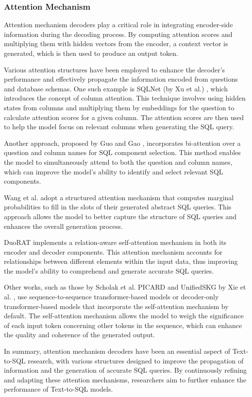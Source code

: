 \subsubsection{Attention Mechanism}

Attention mechanism decoders play a critical role in integrating encoder-side information during the decoding process. By computing attention scores and multiplying them with hidden vectors from the encoder, a context vector is generated, which is then used to produce an output token.

Various attention structures have been employed to enhance the decoder's performance and effectively propagate the information encoded from questions and database schemas. One such example is SQLNet (by Xu et al.) \cite{xu_sqlnet_2017}, which introduces the concept of column attention. This technique involves using hidden states from columns and multiplying them by embeddings for the question to calculate attention scores for a given column. The attention scores are then used to help the model focus on relevant columns when generating the SQL query.

Another approach, proposed by Guo and Gao  \cite{guo2020content}, incorporates bi-attention over a question and column names for SQL component selection. This method enables the model to simultaneously attend to both the question and column names, which can improve the model's ability to identify and select relevant SQL components.

Wang et al.  \cite{wang-etal-2019-learning} adopt a structured attention mechanism \cite{kim2017structured} that computes marginal probabilities to fill in the slots of their generated abstract SQL queries. This approach allows the model to better capture the structure of SQL queries and enhances the overall generation process.

DuoRAT \cite{scholak-etal-2021-duorat} implements a relation-aware self-attention mechanism in both its encoder and decoder components. This attention mechanism accounts for relationships between different elements within the input data, thus improving the model's ability to comprehend and generate accurate SQL queries.

Other works, such as those by Scholak et al. PICARD  \cite{Scholak2021:PICARD} and UnifiedSKG by Xie et al.  \cite{xie2022unifiedskg}, use sequence-to-sequence transformer-based models or decoder-only transformer-based models that incorporate the self-attention mechanism by default. The self-attention mechanism allows the model to weigh the significance of each input token concerning other tokens in the sequence, which can enhance the quality and coherence of the generated output.

In summary, attention mechanism decoders have been an essential aspect of Text-to-SQL research, with various structures designed to improve the propagation of information and the generation of accurate SQL queries. By continuously refining and adapting these attention mechanisms, researchers aim to further enhance the performance of Text-to-SQL models.